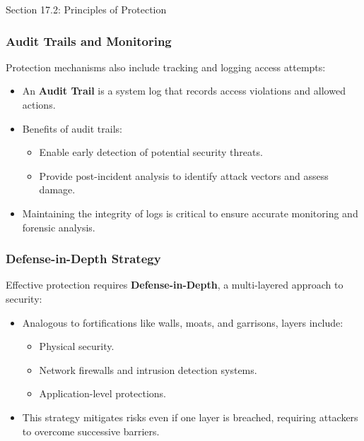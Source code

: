 \begin{notes}{Section 17.2: Principles of Protection}
    \subsubsection*{Audit Trails and Monitoring}
    
    Protection mechanisms also include tracking and logging access attempts:
    \begin{itemize}
        \item An \textbf{Audit Trail} is a system log that records access violations and allowed actions.
        \item Benefits of audit trails:
        \begin{itemize}
            \item Enable early detection of potential security threats.
            \item Provide post-incident analysis to identify attack vectors and assess damage.
        \end{itemize}
        \item Maintaining the integrity of logs is critical to ensure accurate monitoring and forensic analysis.
    \end{itemize}
    
    \subsubsection*{Defense-in-Depth Strategy}
    
    Effective protection requires \textbf{Defense-in-Depth}, a multi-layered approach to security:
    \begin{itemize}
        \item Analogous to fortifications like walls, moats, and garrisons, layers include:
        \begin{itemize}
            \item Physical security.
            \item Network firewalls and intrusion detection systems.
            \item Application-level protections.
        \end{itemize}
        \item This strategy mitigates risks even if one layer is breached, requiring attackers to overcome successive barriers.
    \end{itemize}
    

\end{notes}
